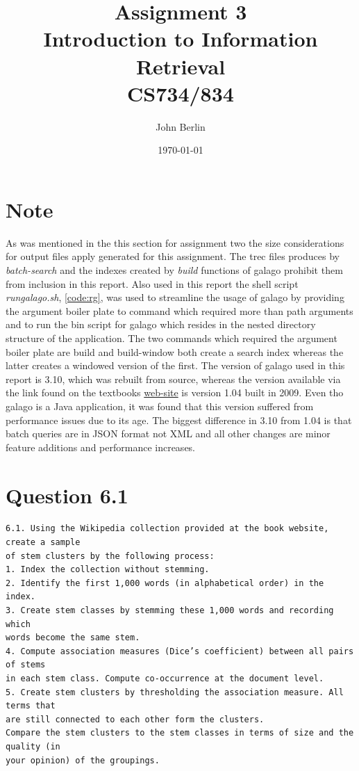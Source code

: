 \documentclass[11pt]{article}
\title{Assignment 3 \\ Introduction to Information Retrieval \\ CS734/834}
\author{John Berlin}
\date{\today}
\begin{document}
\maketitle
\newpage
\section*{Note}
As was mentioned in the this section for assignment two the size considerations for output files apply generated for this assignment.
The trec files produces by \textit{batch-search} and the indexes created by \textit{build} functions of galago prohibit them from inclusion in this report. Also used in this report the shell script \textit{rungalago.sh}, \autoref{code:rg}, was used to streamline the usage of galago by providing the argument boiler plate to command which required more than path arguments and to run the bin script for galago which resides in the nested directory structure of the application.  The two commands which required the argument boiler plate are build and build-window both create a search index whereas the latter creates a windowed version of the first. \newline 
The version of galago used in this report is 3.10, which was rebuilt from source, whereas the version available via the link found on the textbooks \href{http://www.search-engines-book.com/}{web-site} is version 1.04 built in 2009. Even tho galago is a Java application, it was found that this version suffered from performance issues due to its age. The biggest difference in 3.10 from 1.04 is that batch queries are in JSON format not XML and all other changes are minor feature additions and performance increases.
\newpage
\section{Question 6.1} \label{q1}
\begin{verbatim}
6.1. Using the Wikipedia collection provided at the book website, create a sample
of stem clusters by the following process:
1. Index the collection without stemming.
2. Identify the first 1,000 words (in alphabetical order) in the index.
3. Create stem classes by stemming these 1,000 words and recording which
words become the same stem.
4. Compute association measures (Dice’s coefficient) between all pairs of stems
in each stem class. Compute co-occurrence at the document level.
5. Create stem clusters by thresholding the association measure. All terms that
are still connected to each other form the clusters.
Compare the stem clusters to the stem classes in terms of size and the quality (in
your opinion) of the groupings.
\end{verbatim}
\end{document}

